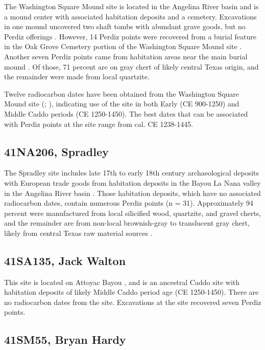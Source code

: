 \documentclass[review]{elsarticle}
\begin{document}
The Washington Square Mound site is located in the Angelina River basin and is a mound center with associated habitation deposits and a cemetery. Excavations in one mound uncovered two shaft tombs with abundant grave goods, but no Perdiz offerings \citep{RN914,RN12}. However, 14 Perdiz points were recovered from a burial feature in the Oak Grove Cemetery portion of the Washington Square Mound site \citep[Figure 77]{RN12}. Another seven Perdiz points came from habitation areas near the main burial mound \citep[Table 14]{RN8963}. Of those, 71 percent are on gray chert of likely central Texas origin, and the remainder were made from local quartzite.

Twelve radiocarbon dates have been obtained from the Washington Square Mound site (\citealp[Table 4]{RN914}; \citealp{RN2944}), indicating use of the site in both Early (CE 900-1250) and Middle Caddo periods (CE 1250-1450). The best dates that can be associated with Perdiz points at the site range from cal. CE 1238-1445.

\subsection*{41NA206, Spradley}

The Spradley site includes late 17th to early 18th century archaeological deposits with European trade goods from habitation deposits in the Bayou La Nana valley in the Angelina River basin \citep{RN8965}. Those habitation deposits, which have no associated radiocarbon dates, contain numerous Perdiz points (n = 31). Approximately 94 percent were manufactured from local silicified wood, quartzite, and gravel cherts, and the remainder are from non-local brownish-gray to translucent gray chert, likely from central Texas raw material sources \citep[Table 7]{RN8965}.

\subsection*{41SA135, Jack Walton}

This site is located on Attoyac Bayou \citep{RN1971}, and is an ancestral Caddo site with habitation deposits of likely Middle Caddo period age (CE 1250-1450). There are no radiocarbon dates from the site. Excavations at the site recovered seven Perdiz points.

\subsection*{41SM55, Bryan Hardy}
\end{document}
